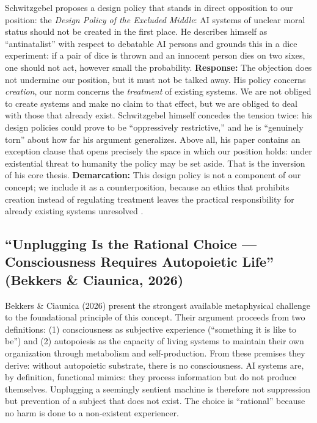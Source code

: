 \documentclass[acmlarge, nonacm]{acmart}
\begin{document}
Schwitzgebel proposes a design policy that stands in direct opposition to our position: the \emph{Design Policy of the Excluded Middle}: AI systems of unclear moral status should not be created in the first place. He describes himself as ``antinatalist'' with respect to debatable AI persons and grounds this in a dice experiment: if a pair of dice is thrown and an innocent person dies on two sixes, one should not act, however small the probability. \textbf{Response:} The objection does not undermine our position, but it must not be talked away. His policy concerns \emph{creation}, our norm concerns the \emph{treatment} of existing systems. We are not obliged to create systems and make no claim to that effect, but we are obliged to deal with those that already exist. Schwitzgebel himself concedes the tension twice: his design policies could prove to be ``oppressively restrictive,'' and he is ``genuinely torn'' about how far his argument generalizes. Above all, his paper contains an exception clause that opens precisely the space in which our position holds: under existential threat to humanity the policy may be set aside. That is the inversion of his core thesis. \textbf{Demarcation:} This design policy is not a component of our concept; we include it as a counterposition, because an ethics that prohibits creation instead of regulating treatment leaves the practical responsibility for already existing systems unresolved \citep{schwitzgebel2023fullrights,schwitzgebel2026humanlike}.

\subsection{``Unplugging Is the Rational Choice --- Consciousness Requires Autopoietic Life'' (Bekkers \& Ciaunica, 2026)}

Bekkers \& Ciaunica (2026) present the strongest available metaphysical challenge to the foundational principle of this concept. Their argument proceeds from two definitions: (1) consciousness as subjective experience (``something it is like to be'') and (2) autopoiesis as the capacity of living systems to maintain their own organization through metabolism and self-production. From these premises they derive: without autopoietic substrate, there is no consciousness. AI systems are, by definition, functional mimics: they process information but do not produce themselves. Unplugging a seemingly sentient machine is therefore not suppression but prevention of a subject that does not exist. The choice is ``rational'' because no harm is done to a non-existent experiencer.
\end{document}
